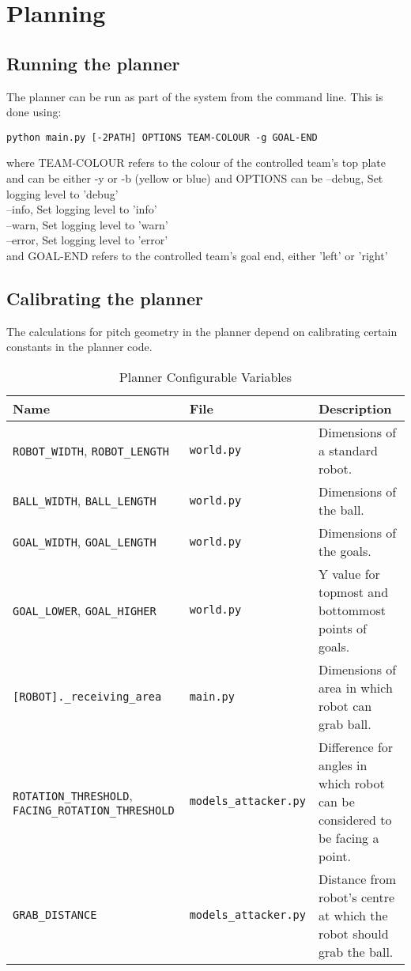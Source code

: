 \section{Planning}
\lstset{language=Bash, showstringspaces=false}

\subsection{Running the planner}

The planner can be run as part of the system from the command line. This is done using:

\begin{lstlisting}
python main.py [-2PATH] OPTIONS TEAM-COLOUR -g GOAL-END
\end{lstlisting}

where TEAM-COLOUR refers to the colour of the controlled team's top plate and can be either -y or -b (yellow or blue)
and OPTIONS can be --debug, Set logging level to 'debug' \\
	   	   --info,  Set logging level to 'info' \\
		   --warn,  Set logging level to 'warn' \\
		   --error, Set logging level to 'error' \\
and GOAL-END refers to the controlled team's goal end, either 'left' or 'right'

\subsection{Calibrating the planner}

The calculations for pitch geometry in the planner depend on calibrating certain constants in the planner code.


\begin{table}[H]
\begin{tabularx}{\textwidth}{ XlX }
\toprule
\textbf{Name} & \textbf{File} & \textbf{Description} \\
\midrule
\verb|ROBOT_WIDTH|, \verb|ROBOT_LENGTH| & \texttt{world.py} & Dimensions of a standard robot. \\
\verb|BALL_WIDTH|, \verb|BALL_LENGTH| & \texttt{world.py} & Dimensions of the ball. \\
\verb|GOAL_WIDTH|, \verb|GOAL_LENGTH| & \texttt{world.py} & Dimensions of the goals. \\
\verb|GOAL_LOWER|, \verb|GOAL_HIGHER| & \texttt{world.py} & Y value for topmost and bottommost points of goals. \\
\verb|[ROBOT]._receiving_area| & \texttt{main.py} & Dimensions of area in which robot can grab ball. \\
\verb|ROTATION_THRESHOLD|, \verb|FACING_ROTATION_THRESHOLD| &\texttt{models\_attacker.py} & Difference for angles in which robot can be considered to be facing a point. \\
\verb|GRAB_DISTANCE| & \texttt{models\_attacker.py} & Distance from robot's centre at which the robot should grab the ball. \\
\bottomrule
\end{tabularx}
\caption{Planner Configurable Variables}
\end{table}
